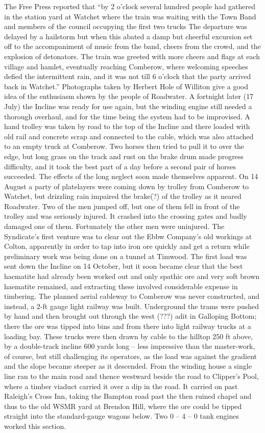 \documentclass[11pt]{book}
\begin{document}
   The Free Press reported that “by 2 o’clock several hundred people had gathered in the station yard at Watchet where the train was waiting with the Town Band and members of the council occupying the first two trucks    The departure was delayed by a hailstorm but when this abated a damp but cheerful excursion set off to the accompaniment of music from the band, cheers from the crowd, and the explosion of detonators. The train was greeted with more cheers and flags at each village and hamlet, eventually reaching Comberow, where welcoming speeches defied the intermittent rain, and it was not till 6 o’clock that the party arrived back in Watchet.”  Photographs taken by Herbert  Hole of Williton  give a good idea of the enthusiasm shown by the people of Roadwater.  
  A fortnight later (17 July) the Incline was ready for use again, but the winding engine still needed a thorough overhaul, and for the time being the system had to be improvised. A hand trolley was taken by road to the top of the Incline and there loaded with old rail and concrete scrap and connected to the cable, which was also attached to an empty truck at Comberow. Two horses then tried to pull it to over the edge, but long grass on the track and rust on the brake drum made progress difficulty, and it took the best part of a day before a second pair of horses succeeded.
  The effects of the long neglect soon made themselves apparent. On 14 August a party of platelayers were coming down by trolley from Comberow to Watchet, but drizzling rain impaired the brake(?) of the trolley as it neared Roadwater. Two of the men jumped off, but one of them fell in front of the trolley and was seriously injured. It crashed into the crossing gates and badly damaged one of them. Fortunately the other men were uninjured. 
   The Syndicate’s first venture was to clear out the Ebbw Company’s old workings at Colton, apparently in order to tap into iron ore quickly and get a return while preliminary work was being done on a tunnel at Timwood. The first load was sent down the Incline on 14 October, but it soon became clear that the best haematite had already been worked out and only spathic ore and very soft brown haematite remained, and extracting these involved considerable expense in timbering.  The planned aerial cableway to Comberow was never constructed, and instead, a 2-ft gauge light railway was built. Underground the trams were pushed by hand and then brought out through the west (???) adit in Galloping Bottom; there the ore was tipped into bins and from there into light railway trucks at a loading bay. These trucks were then drawn by cable to the hilltop 250 ft above, by a double-track incline 600 yards long – less impressive than the master-work, of course, but still challenging its operators, as the load was against the gradient and the slope became steeper as it descended.  From the winding house a single line ran to the main road and thence westward beside the road to Clipper’s Pool, where a timber viaduct carried it over a dip in the road. It carried on past Raleigh’s Cross Inn, taking the Bampton road past the then ruined chapel and thus to the old WSMR yard at Brendon Hill, where the ore could be tipped straight into the standard-gauge wagons below. Two 0 – 4 – 0 tank engines worked this section.
\end{document}
